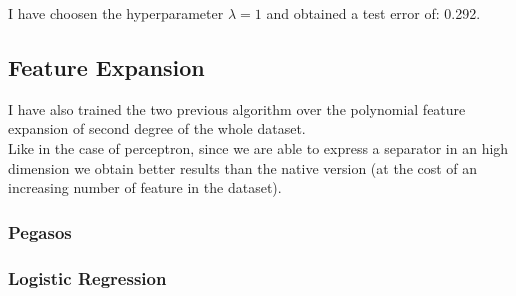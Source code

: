 I have choosen the hyperparameter $\lambda = 1$ and obtained a test error of: 0.292.\\

\subsection{Feature Expansion}
I have also trained the two previous algorithm over the polynomial feature expansion of second degree of the whole dataset.\\
Like in the case of perceptron, since we are able to express a separator in an high dimension we obtain better results than the native version (at the cost of an increasing number of feature in the dataset).\\  
\subsubsection{Pegasos}
\subsubsection{Logistic Regression}
